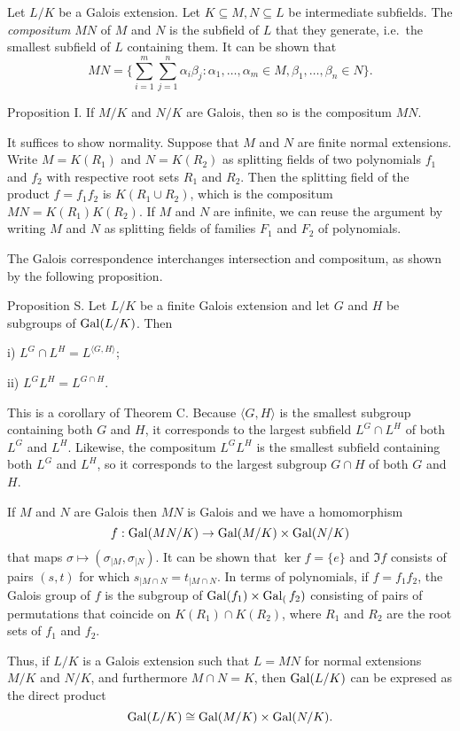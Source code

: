Let $L/K$ be a Galois extension. Let $K\subseteq M,N\subseteq L$ be intermediate subfields. The {\it compositum} $MN$ of $M$ and $N$ is the subfield of $L$ that they generate, i.e.\ the smallest subfield of $L$ containing them. It can be shown that
$$MN = \bigg\{\sum_{i=1}^m \sum_{j=1}^n \alpha_i\beta_j : \alpha_1,\ldots,\alpha_m \in M, \beta_1,\ldots,\beta_n\in N\bigg\}.$$

\proclaim Proposition I. If $M/K$ and $N/K$ are Galois, then so is the compositum $MN$.

\proof It suffices to show normality. Suppose that $M$ and $N$ are finite normal extensions. Write $M = K(R_1)$ and $N=K(R_2)$ as splitting fields of two polynomials $f_1$ and $f_2$ with respective root sets $R_1$ and $R_2$. Then the splitting field of the product $f = f_1f_2$ is $K(R_1\cup R_2)$, which is the compositum $MN = K(R_1)K(R_2)$. If $M$ and $N$ are infinite, we can reuse the argument by writing $M$ and $N$ as splitting fields of families $F_1$ and $F_2$ of polynomials.\slug

The Galois correspondence interchanges intersection and compositum, as shown by the following proposition.

\proclaim Proposition S. Let $L/K$ be a finite Galois extension and let $G$ and $H$ be subgroups of $\mathop {\rm Gal}(L/K)$. Then
\medskip
\item{i)} $L^G \cap L^H = L^{\langle G,H \rangle}$;
\smallskip
\item{ii)} $L^GL^H = L^{G\cap H}$.
\medskip

\proof This is a corollary of Theorem C. Because $\langle G,H\rangle$ is the smallest subgroup containing both $G$ and $H$, it corresponds to the largest subfield $L^G\cap L^H$ of both $L^G$ and $L^H$. Likewise, the compositum $L^GL^H$ is the smallest subfield containing both $L^G$ and $L^H$, so it corresponds to the largest subgroup $G\cap H$ of both $G$ and $H$.\slug

If $M$ and $N$ are Galois then $MN$ is Galois and we have a homomorphism
$$f : \mathop {\rm Gal}(MN/K) \to \mathop {\rm Gal}(M/K) \times \mathop {\rm Gal}(N/K)$$
that maps $\sigma\mapsto (\sigma_{|M},\sigma_{|N})$. It can be shown that $\ker f = \{e\}$ and $\Im f$ consists of pairs $(s,t)$ for which $s_{|M\cap N} = t_{|M\cap N}$. In terms of polynomials, if $f = f_1f_2$, the Galois group of $f$ is the subgroup of $\mathop {\rm Gal}(f_1)\times \mathop {\rm Gal}_(f_2)$ consisting of pairs of permutations that coincide on $K(R_1)\cap K(R_2)$, where $R_1$ and $R_2$ are the root sets of $f_1$ and $f_2$.

Thus, if $L/K$ is a Galois extension such that $L = MN$ for normal extensions $M/K$ and $N/K$, and furthermore $M\cap N = K$, then $\mathop {\rm Gal}(L/K)$ can be expresed as the direct product
$$\mathop {\rm Gal}(L/K)\cong \mathop {\rm Gal}(M/K) \times \mathop {\rm Gal}(N/K).$$


\bye
